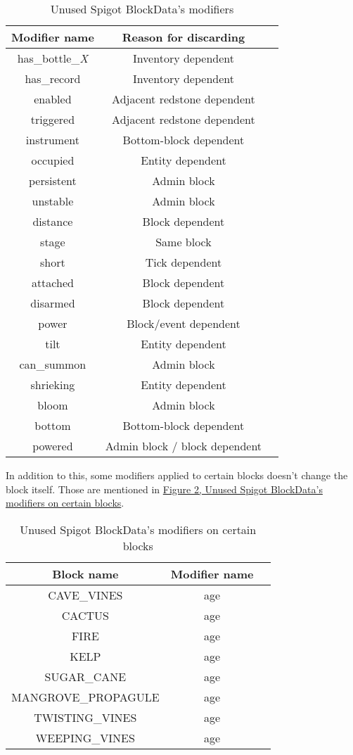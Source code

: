 \documentclass[11pt]{article}
\begin{document}
\begin{table}[h]
	\centering
	\begin{tabular}{ |c|c|c| }
		\hline
		Modifier name & Reason for discarding \\
		\hline
		has\_bottle\_\it{X} & Inventory dependent \\
		has\_record & Inventory dependent \\
		enabled & Adjacent redstone dependent \\
		triggered & Adjacent redstone dependent \\
		instrument & Bottom-block dependent \\
		occupied & Entity dependent \\
		persistent & Admin block \\
		unstable & Admin block \\
		distance & Block dependent \\
		stage & Same block \\
		short & Tick dependent \\
		attached & Block dependent \\
		disarmed & Block dependent \\
		power & Block/event dependent \\
		tilt & Entity dependent \\
		can\_summon & Admin block \\
		shrieking & Entity dependent \\
		bloom & Admin block \\
		bottom & Bottom-block dependent \\
		powered & Admin block / block dependent \\
		\hline
	\end{tabular}
	\caption{Unused Spigot BlockData's modifiers}
	\label{fig:unused-blockdata}
\end{table}

In addition to this, some modifiers applied to certain blocks doesn't change the block itself. Those are mentioned in \hyperref[fig:unused-blockdata-blocks]{Figure \ref{fig:unused-blockdata-blocks}, Unused Spigot BlockData's modifiers on certain blocks}.

\begin{table}[h]
	\centering
	\begin{tabular}{ |c|c|c| }
		\hline
		Block name & Modifier name \\
		\hline
		CAVE\_VINES & age \\
		CACTUS & age \\
		FIRE & age \\
		KELP & age \\
		SUGAR\_CANE & age \\
		MANGROVE\_PROPAGULE & age \\
		TWISTING\_VINES & age \\
		WEEPING\_VINES & age \\
		\hline
	\end{tabular}
	\caption{Unused Spigot BlockData's modifiers on certain blocks}
	\label{fig:unused-blockdata-blocks}
\end{table}
\end{document}
